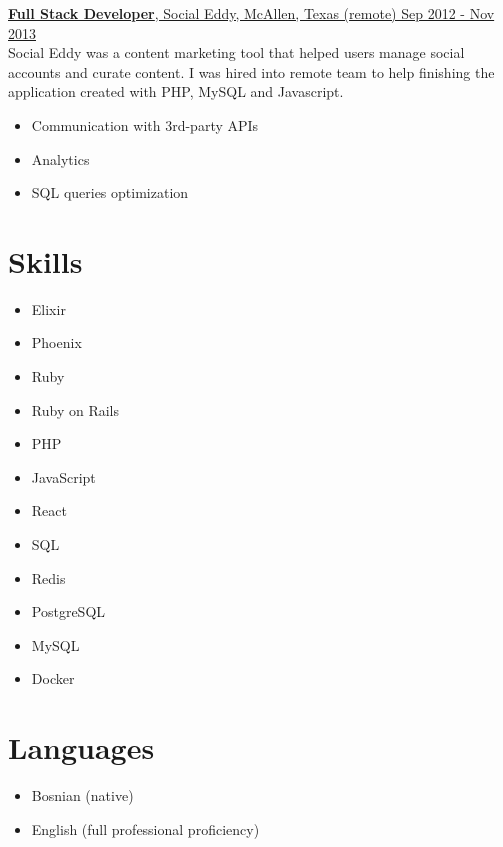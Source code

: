 \documentclass[margin]{res}
\begin{document}
\begin{resume}
\uline{{\bf Full Stack Developer}, Social Eddy, McAllen, Texas (remote)
  \hfill Sep 2012 - Nov 2013}\vspace{3pt}\\
Social Eddy was a content marketing tool that helped users manage social accounts and curate content. I was hired into remote team to help finishing the application created with PHP, MySQL and Javascript.
\vspace{3pt}
\begin{itemize} \itemsep -1pt %
  \item Communication with 3rd-party APIs
  \item Analytics
  \item SQL queries optimization
\end{itemize}


\section{Skills}
\begin{multicols}{3}
  \begin{itemize}[label={}, leftmargin=0cm, itemsep=0cm]
      \item Elixir
  \item Phoenix
  \item Ruby
  \item Ruby on Rails
  \item PHP
  \item JavaScript
  \item React
  \item SQL
  \item Redis
  \item PostgreSQL
  \item MySQL
  \item Docker
  \end{itemize}
\end{multicols}

\section{Languages}
\begin{itemize}[label={}, leftmargin=0cm, itemsep=0cm]
  \item Bosnian (native)
  \item English (full professional proficiency)
\end{itemize}

\end{resume}
\end{document}
